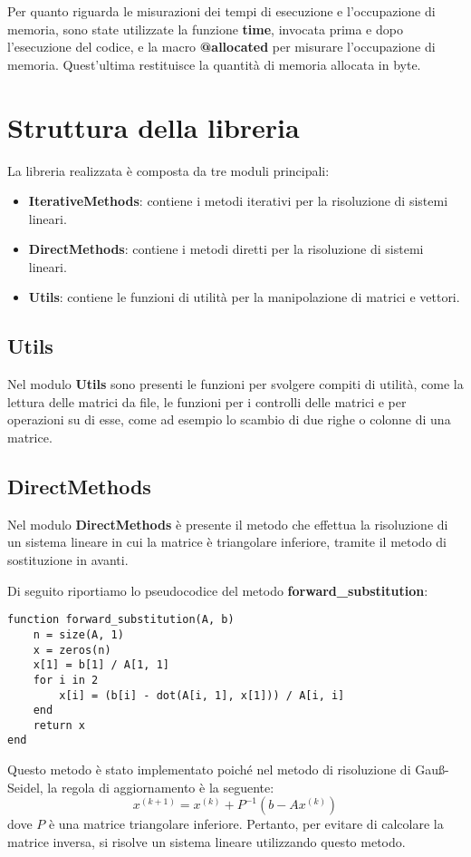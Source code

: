 \documentclass{article}
\begin{document}
Per quanto riguarda le misurazioni dei tempi di esecuzione e l'occupazione di
memoria, sono state utilizzate la funzione \textbf{time}, invocata prima e dopo
l'esecuzione del codice, e la macro \textbf{@allocated} per misurare l'occupazione
di memoria. Quest'ultima restituisce la quantità di memoria allocata in byte.

\section{Struttura della libreria}
La libreria realizzata è composta da tre moduli principali:
\begin{itemize}
    \item \textbf{IterativeMethods}: contiene i metodi iterativi per la risoluzione
          di sistemi lineari.
    \item \textbf{DirectMethods}: contiene i metodi diretti per la risoluzione
          di sistemi lineari.
    \item \textbf{Utils}: contiene le funzioni di utilità per la manipolazione
          di matrici e vettori.
\end{itemize}

\subsection{Utils}
Nel modulo \textbf{Utils} sono presenti le funzioni per svolgere compiti di
utilità, come la lettura delle matrici da file, le funzioni per i controlli delle
matrici e per operazioni su di esse, come ad esempio lo scambio di due righe o
colonne di una matrice.

\subsection{DirectMethods}
Nel modulo \textbf{DirectMethods} è presente il metodo che effettua la risoluzione
di un sistema lineare in cui la matrice è triangolare inferiore, tramite il
metodo di sostituzione in avanti.

Di seguito riportiamo lo pseudocodice del metodo \textbf{forward\_substitution}:
\begin{verbatim}
function forward_substitution(A, b)
    n = size(A, 1)
    x = zeros(n)
    x[1] = b[1] / A[1, 1]
    for i in 2
        x[i] = (b[i] - dot(A[i, 1], x[1])) / A[i, i]
    end
    return x
end
\end{verbatim}
Questo metodo è stato implementato poiché nel metodo di risoluzione di Gauß-Seidel,
la regola di aggiornamento è la seguente:
\begin{equation}
    x^{(k+1)} = x^{(k)} + P^{-1}(b - Ax^{(k)})
\end{equation}
dove $P$ è una matrice triangolare inferiore. Pertanto, per evitare di calcolare
la matrice inversa, si risolve un sistema lineare utilizzando questo metodo.
\end{document}
